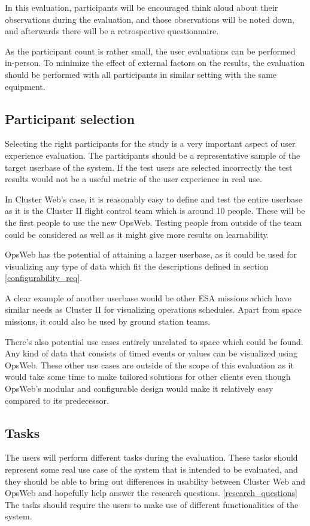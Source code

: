 In this evaluation, participants will be encouraged think aloud about their observations during the evaluation, and those observations will be noted down, and afterwards there will be a retrospective questionnaire.

As the participant count is rather small, the user evaluations can be performed in-person. To minimize the effect of external factors on the results, the evaluation should be performed with all participants in similar setting with the same equipment.

\subsection{Participant selection}
Selecting the right participants for the study is a very important aspect of user experience evaluation. The participants should be a representative sample of the target userbase of the system. If the test users are selected incorrectly the test results would not be a useful metric of the user experience in real use.

In Cluster Web's case, it is reasonably easy to  define and test the entire userbase as it is the Cluster II flight control team which is around 10 people. These will be the  first people to use the new OpsWeb. Testing people from outside of the team could be considered as well as it might give more results on learnability.

OpsWeb has the potential of attaining a larger userbase, as it could be used for visualizing any type of data which fit the descriptions defined in section \ref{configurability_req}. 

A clear example of another userbase would be other ESA missions which have similar needs as Cluster II for visualizing operations schedules. Apart from space missions, it could also be used by ground station teams.

There's also potential use cases entirely unrelated to space which could be found. Any kind of data that consists of timed events or values can be visualized using OpsWeb. These other use cases are outside of the scope of this evaluation as it would take some time to make tailored solutions for other clients even though OpsWeb's modular and configurable design would make it relatively easy compared to its predecessor.

\cite{rubin2008handbook, albert2013measuring}

\subsection{Tasks}
The users will perform different tasks during the evaluation. These tasks should represent some real use case of the system that is intended to be evaluated, and they should be able to bring out differences in usability between Cluster Web and OpsWeb and hopefully help answer the research questions. \ref{research_questions} The tasks should require the users to make use of different functionalities of the system.

